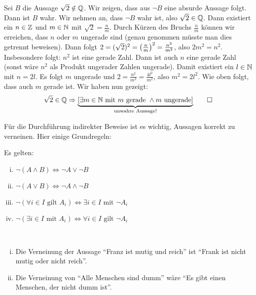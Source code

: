 \begin{beweis}
	Sei $B$ die Aussage $\sqrt{2} \notin \mathbb{Q}$.
	Wir zeigen, dass aus $\neg B$ eine absurde Aussage folgt.
	Dann ist $B$ wahr.
	Wir nehmen an, dass $\neg B$ wahr ist, also $\sqrt{2} \in \mathbb{Q}$.
	Dann existiert ein $n \in \mathbb{Z}$ und $m \in \mathbb{N}$ mit $\sqrt{2} = \frac{n}{m}$.
	Durch Kürzen des Bruchs $\frac{n}{m}$ können wir erreichen, dass $n$ oder $m$ ungerade sind (genau genommen müsste man dies getrennt beweisen).
	Dann folgt $2 = (\sqrt{2})^2 = \left(\frac{n}{m}\right)^2 = \frac{n^2}{m^2}$, also $2m^2 = n^2$.
	Insbesondere folgt: $n^2$ ist eine gerade Zahl.
	Dann ist auch $n$ eine gerade Zahl (sonst wäre $n^2$ als Produkt ungerader Zahlen ungerade).
	Damit existiert ein $l \in \mathbb{N}$ mit $n = 2l$.
	Es folgt $m$ ungerade und $2 = \frac{n^2}{m^2} = \frac{4l^2}{m^2}$, also $m^2 = 2l^2$.
	Wie oben folgt, dass auch $m$ gerade ist.
	Wir haben nun gezeigt:
	\[
		\sqrt{2} \in \mathbb{Q} \Rightarrow {\underbrace{[\exists m \in \mathbb{N}\text{ mit } m \text{ gerade } \wedge m \text{ ungerade}]}_{\text{unwahre Aussage!}}} \qedhere
	\]
\end{beweis}

Für die Durchführung indirekter Beweise ist es wichtig, Aussagen korrekt zu verneinen.
Hier einige Grundregeln:

\begin{lemma}
	\label{lemma:I.1.6}
	Es gelten:
	\begin{enumerate}[(i)]
		\item $\neg(A \wedge B) \Leftrightarrow \neg A \vee \neg B$
		\item $\neg(A \vee B) \Leftrightarrow \neg A \wedge \neg B$
		\item $\neg(\forall i \in I \text{ gilt } A_i) \Leftrightarrow \exists i \in I \text{ mit } \neg A_i$
		\item $\neg(\exists i \in I \text{ mit } A_i) \Leftrightarrow \forall i \in I \text{ gilt } \neg A_i$
	\end{enumerate}
\end{lemma}

\begin{beispiel}
	\label{bsp:I.1.7}
	\mbox{} \\[-1.4cm]
	\begin{enumerate}[(i)]
		\item Die Verneinung der Aussage \enquote{Franz ist mutig und reich} ist \enquote{Frank ist nicht mutig oder nicht reich}.
		\item Die Verneinung von \enquote{Alle Menschen sind dumm} wäre \enquote{Es gibt einen Menschen, der nicht dumm ist}.
	\end{enumerate}
\end{beispiel}

